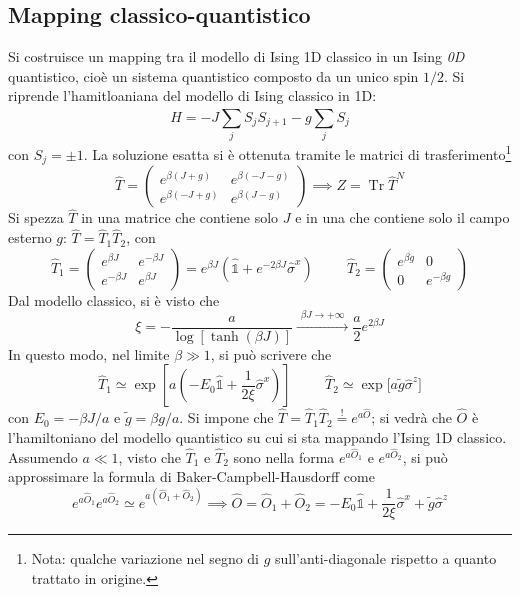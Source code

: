 \documentclass[11pt, a4paper]{scrartcl}
\theoremstyle{style}
\theoremstyle{style1}
\numberwithin{equation}{subsection}
\begin{document}
\subsection{Mapping classico-quantistico}
Si costruisce un mapping tra il modello di Ising 1D classico in un Ising \textit{0D} quantistico, cio\`e un sistema quantistico composto da un unico spin $1 / 2$.
Si riprende l'hamitloaniana del modello di Ising classico in 1D:
\[
H = -J \sum_{j}^{} S_j S_{j+1}  - g \sum_{j}^{} S_j
\] 
con $S_j = \pm 1$.
La soluzione esatta si \`e ottenuta tramite le matrici di trasferimento\footnote{Nota: qualche variazione nel segno di $g$ sull'anti-diagonale rispetto a quanto trattato in origine.}
\[
	\hat{T} = \begin{pmatrix} e^{\beta (J+g)}& e^{\beta (-J - g)}\\ e^{\beta (-J + g)} & e^{\beta (J-g)} \end{pmatrix} \implies Z = \operatorname{Tr} \hat{T}^N
\] 
Si spezza $\hat{T}$ in una matrice che contiene solo $J$ e in una che contiene solo il campo esterno $g$: $\hat{T} = \hat{T}_1\hat{T}_2$, con
\[
	\hat{T}_1 = \begin{pmatrix} e^{\beta J} & e^{-\beta J} \\ e^{-\beta J} & e^{\beta J} \end{pmatrix} = e^{\beta J} \left(\hat{\mathds{1}} + e^{-2 \beta J}\hat{\sigma }^x\right) \hspace{1cm} \hat{T}_2 = \begin{pmatrix} e^{\beta g}& 0 \\ 0 & e^{-\beta g} \end{pmatrix} 
\] 
Dal modello classico, si \`e visto che
\[
	\xi  = - \frac{a}{\log\left[\tanh \left(\beta J\right) \right] } \xrightarrow{\, \ \beta J \to +\infty \ \, } \frac{a}{2} e^{2 \beta J}
\] 
In questo modo, nel limite $\beta \gg 1$, si pu\`o scrivere che
\[
	\hat{T}_1 \simeq  \exp\left[ a \left( -E_0 \hat{\mathds{1}}+ \frac{1}{2\xi }\hat{\sigma }^x \right)  \right] \hspace{1cm} \hat{T}_2 \simeq \exp\Big[ a \tilde{g} \hat{\sigma }^z \Big] 
\] 
con $E_0 = -\beta J / a$ e $\tilde{g} = \beta g / a$.
Si impone che $\hat{T} = \hat{T}_1 \hat{T}_2 \stackrel{!}{=} e^{a \hat{O}}$; si vedr\`a che $\hat{O}$ \`e l'hamiltoniano del modello quantistico su cui si sta mappando l'Ising 1D classico.
Assumendo $a \ll 1$, visto che $\hat{T}_1 $ e $\hat{T}_2$ sono nella forma $e^{a \hat{O}_1}$ e $e^{a \hat{O}_2}$, si pu\`o approssimare la formula di Baker-Campbell-Hausdorff come
\[
	e^{a \hat{O}_1}e^{a \hat{O}_2} \simeq e^{a (\hat{O}_1 + \hat{O}_2) }\implies \hat{O} = \hat{O}_1 + \hat{O}_2 = - E_0 \hat{\mathds{1}} + \frac{1}{2\xi }\hat{\sigma }^x + \tilde{g}\hat{\sigma }^z
\] 
\end{document}
